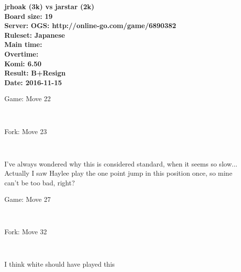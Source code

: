 \documentclass{article}
\begin{document}
\begin{titlepage}
    \null
    \vfill
    \begin{center}
        \textbf{jrhoak (3k) vs jarstar (2k)}\\
        \textbf{Board size: 19}\\
        \textbf{Server: OGS: http://online-go.com/game/6890382}\\
        \textbf{Ruleset: Japanese}\\
        \textbf{Main time: }\\
        \textbf{Overtime: }\\
        \textbf{Komi: 6.50}\\
        \textbf{Result: B+Resign}\\
        \textbf{Date: 2016-11-15}
    \end{center}
    \vfill
\end{titlepage}
\newpage
\tableofcontents
\newpage
\begin{section}{Game: Move 22}
\begin{center}
\cleargoban
{}
\showfullgoban
\\\parbox{4.5in}{
}
\end{center}
\end{section}
\begin{subsection}{Fork: Move 23}
\begin{center}
\cleargoban
{}
\showfullgoban
\\\parbox{4.5in}{
I've always wondered why this is considered standard, when it seems so slow...\\Actually I saw Haylee play the one point jump in this position once, so mine can't be too bad, right?}
\end{center}
\end{subsection}
\newpage
\begin{section}{Game: Move 27}
\begin{center}
\cleargoban
{}
\showfullgoban
\\\parbox{4.5in}{
}
\end{center}
\end{section}
\begin{subsection}{Fork: Move 32}
\begin{center}
\cleargoban
{}
\showfullgoban
\\\parbox{4.5in}{
I think white should have played this}
\end{center}
\end{subsection}
\end{document}
